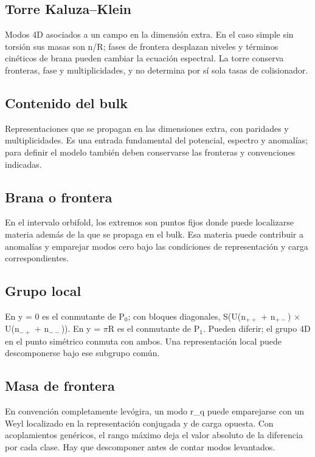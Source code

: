 \documentclass[11pt,a4paper]{article}
\begin{document}
\subsection*{Torre Kaluza--Klein}
Modos 4D asociados a un campo en la dimensión extra. En el caso simple sin torsión sus masas son n/R; fases de frontera desplazan niveles y términos cinéticos de brana pueden cambiar la ecuación espectral. La torre conserva fronteras, fase y multiplicidades, y no determina por sí sola tasas de colisionador.

\subsection*{Contenido del bulk}
Representaciones que se propagan en las dimensiones extra, con paridades y multiplicidades. Es una entrada fundamental del potencial, espectro y anomalías; para definir el modelo también deben conservarse las fronteras y convenciones indicadas.

\subsection*{Brana o frontera}
En el intervalo orbifold, los extremos son puntos fijos donde puede localizarse materia además de la que se propaga en el bulk. Esa materia puede contribuir a anomalías y emparejar modos cero bajo las condiciones de representación y carga correspondientes.

\subsection*{Grupo local}
En y = 0 es el conmutante de P\ensuremath{{}_{0}}; con bloques diagonales, S(U(n\ensuremath{{}_{++}} + n\ensuremath{{}_{+-}}) \ensuremath{\times} U(n\ensuremath{{}_{-+}} + n\ensuremath{{}_{--}})). En y = \ensuremath{\pi}R es el conmutante de P\ensuremath{{}_{1}}. Pueden diferir; el grupo 4D en el punto simétrico conmuta con ambos. Una representación local puede descomponerse bajo ese subgrupo común.

\subsection*{Masa de frontera}
En convención completamente levógira, un modo r\_q puede emparejarse con un Weyl localizado en la representación conjugada y de carga opuesta. Con acoplamientos genéricos, el rango máximo deja el valor absoluto de la diferencia por cada clase. Hay que descomponer antes de contar modos levantados.
\end{document}
